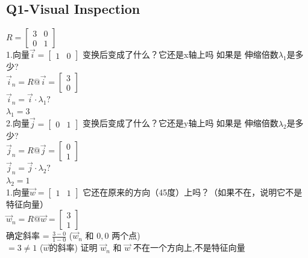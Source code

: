 \documentclass[12pt]{article}
\begin{document}
\subsection{Q1-Visual Inspection}
\begin{flushleft}
$
R = \begin{bmatrix}
    3 & 0 \\
    0 & 1
\end{bmatrix}
$ \\

1.向量$\vec{i}=\begin{bmatrix}
    1 & 0
\end{bmatrix}$ 变换后变成了什么？它还是x轴上吗 如果是 伸缩倍数$\lambda_{1}$是多少? \\
$
\vec{i}_{n} =
R @ \vec{i}
= 
\begin{bmatrix}
    3 \\
    0
\end{bmatrix}$ \\
$\vec{i}_{n} = \vec{i} \cdot \lambda_{1} ?$ \\ 
$\lambda_{1} = 3 $ \\

2.向量$\vec{j}=\begin{bmatrix}
    0 & 1
\end{bmatrix}$ 变换后变成了什么？它还是y轴上吗 如果是 伸缩倍数$\lambda_{2}$是多少? \\
$
\vec{j}_{n} =
R @ \vec{j}
= 
\begin{bmatrix}
    0 \\
    1
\end{bmatrix}$ \\ 
$\vec{j}_{n} = \vec{j} \cdot \lambda_{2} ?$ \\ 
$\lambda_{2} = 1 $ \\

1.向量$\vec{w}=\begin{bmatrix}
    1 & 1
\end{bmatrix}$ 它还在原来的方向（45度）上吗？（如果不在，说明它不是特征向量） \\
$
\vec{w}_{n} =
R @ \vec{w}
= 
\begin{bmatrix}
    3 \\
    1
\end{bmatrix}$ \\

确定斜率 = $\frac{3-0}{1-0}$  ($\vec{w}_{n}$ 和 ${0,0}$ 两个点) \\
$ = 3 \neq 1$ ($\vec{w}$的斜率)
证明 $\vec{w}_{n}$ 和 $\vec{w}$ 不在一个方向上,不是特征向量
\end{flushleft}
\end{document}
